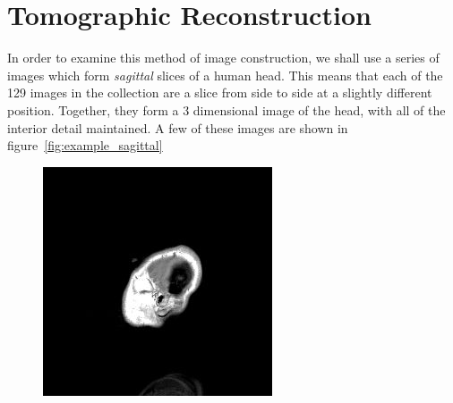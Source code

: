 \section{Tomographic Reconstruction} %
\label{sec:tomographic_reconstruction}
    In order to examine this method of image construction, we shall use a series of images which form \textit{sagittal} slices of a human head. This means that each of the 129 images in the collection are a slice from side to side at a slightly different position. Together, they form a 3 dimensional image of the head, with all of the interior detail maintained. A few of these images are shown in figure~\ref{fig:example_sagittal}
    \begin{figure}[ht]
        \centering
        \begin{minipage}[c]{0.19\linewidth}
            \centering
            \includegraphics[width=\textwidth]{Files/report_images/sagittal_example1.jpg}
        \end{minipage}
        \begin{minipage}[c]{0.19\linewidth}
            \centering

\end{minipage}
\end{figure}
